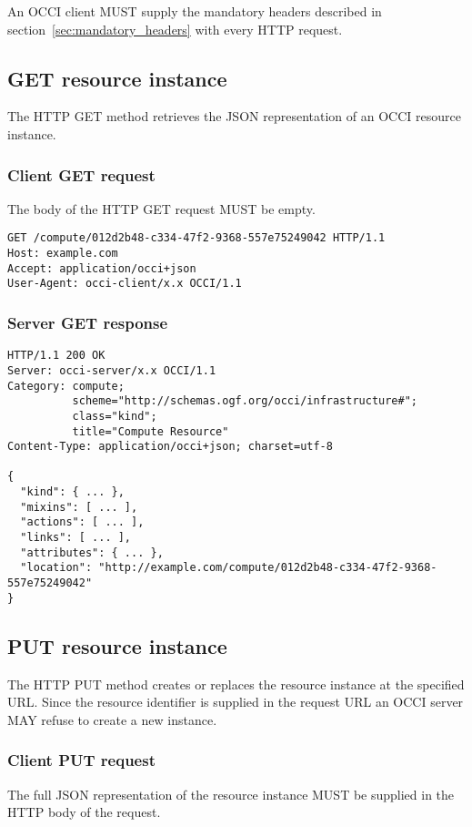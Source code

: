 \documentclass[10pt,a4paper]{article}
\begin{document}
An OCCI client MUST supply the mandatory headers described in
section~\ref{sec:mandatory_headers} with every HTTP request.

\subsection{GET resource instance}
The HTTP GET method retrieves the JSON representation of an OCCI resource
instance.

\subsubsection{Client GET request}
The body of the HTTP GET request MUST be empty.
\begin{verbatim}
GET /compute/012d2b48-c334-47f2-9368-557e75249042 HTTP/1.1
Host: example.com
Accept: application/occi+json
User-Agent: occi-client/x.x OCCI/1.1
\end{verbatim}

\subsubsection{Server GET response}
\begin{verbatim}
HTTP/1.1 200 OK
Server: occi-server/x.x OCCI/1.1
Category: compute;
          scheme="http://schemas.ogf.org/occi/infrastructure#";
          class="kind";
          title="Compute Resource"
Content-Type: application/occi+json; charset=utf-8

{
  "kind": { ... },
  "mixins": [ ... ],
  "actions": [ ... ],
  "links": [ ... ],
  "attributes": { ... },
  "location": "http://example.com/compute/012d2b48-c334-47f2-9368-557e75249042"
}
\end{verbatim}

\subsection{PUT resource instance}
The HTTP PUT method creates or replaces the resource instance at the specified
URL. Since the resource identifier is supplied in the request URL an OCCI
server MAY refuse to create a new instance.

\subsubsection{Client PUT request}
The full JSON representation of the resource instance MUST be supplied in the
HTTP body of the request.
\end{document}
